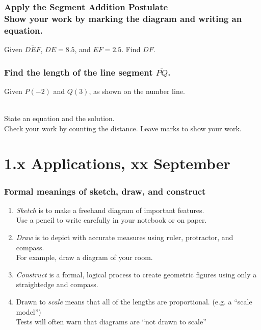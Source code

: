 \documentclass{beamer}
\begin{document}
  \frame
  {
    \frametitle{Apply the Segment Addition Postulate \\
    Show your work by marking the diagram and writing an equation.}
      Given $\overline{DEF}$, $DE=8.5$, and $EF=2.5$. Find ${DF}$.\\[0.75cm]
         \vspace{4cm}
  }

  \frame
  {
    \frametitle{Find the length of the line segment $\overline{PQ}$.}
    Given $P(-2)$ and $Q(3)$, as shown on the number line. \\[0.25cm]
       \\
      State an equation and the solution. \\
  Check your work by counting the distance. Leave marks to show your work. \vspace{5cm}  
  }

\section{1.x Applications, xx September}
\frame
{
  \frametitle{Formal meanings of sketch, draw, and construct}
  \begin{enumerate}
    \item \emph{Sketch} is to make a freehand diagram of important features. \\[0.15cm]
    Use a pencil to write carefully in your notebook or on paper.  \smallskip
    \item \emph{Draw}  is to depict with accurate measures using ruler, protractor, and compass.\\[0.15cm]
    For example, draw a diagram of your room. \smallskip
    \item \emph{Construct} is a formal, logical process to create geometric figures using only a straightedge and compass. \smallskip
    \item Drawn to \emph{scale} means that all of the lengths are proportional. (e.g. a ``scale model'')\\[0.15cm]
    Tests will often warn that diagrams are ``not drawn to scale''
  \end{enumerate}
}
\end{document}
